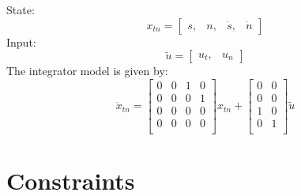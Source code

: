 State:
\[
	x_{tn} = \begin{bmatrix} s, & n, & \dot{s}, & \dot{n} \end{bmatrix}
\]
Input:
\[
	\tilde{u} = \begin{bmatrix} u_t, & u_n \end{bmatrix}
\]
The integrator model is given by:
\begin{equation}
	\dot{x}_{tn} = \begin{bmatrix}
		0 & 0 & 1 & 0 \\
		0 & 0 & 0 & 1 \\
		0 & 0 & 0 & 0 \\
		0 & 0 & 0 & 0 \\
	\end{bmatrix} x_{tn} + \begin{bmatrix}
		0 & 0 \\
		0 & 0 \\
		1 & 0 \\
		0 & 1 \\
	\end{bmatrix} \tilde{u}
\end{equation}

\section{Constraints}


